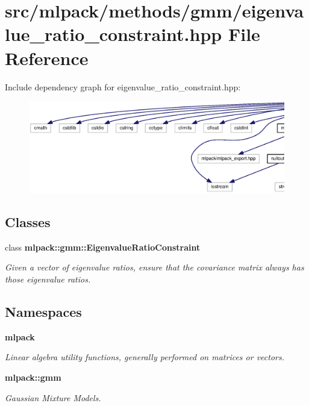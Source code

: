 \section{src/mlpack/methods/gmm/eigenvalue\+\_\+ratio\+\_\+constraint.hpp File Reference}
\label{eigenvalue__ratio__constraint_8hpp}
Include dependency graph for eigenvalue\+\_\+ratio\+\_\+constraint.\+hpp\+:
\nopagebreak
\begin{figure}[H]
\begin{center}
\leavevmode
\includegraphics[width=350pt]{eigenvalue__ratio__constraint_8hpp__incl}
\end{center}
\end{figure}
\subsection*{Classes}
\begin{DoxyCompactItemize}
\item 
class {\bf mlpack\+::gmm\+::\+Eigenvalue\+Ratio\+Constraint}
\begin{DoxyCompactList}\small\item\em Given a vector of eigenvalue ratios, ensure that the covariance matrix always has those eigenvalue ratios. \end{DoxyCompactList}\end{DoxyCompactItemize}
\subsection*{Namespaces}
\begin{DoxyCompactItemize}
\item 
 {\bf mlpack}
\begin{DoxyCompactList}\small\item\em Linear algebra utility functions, generally performed on matrices or vectors. \end{DoxyCompactList}\item 
 {\bf mlpack\+::gmm}
\begin{DoxyCompactList}\small\item\em Gaussian Mixture Models. \end{DoxyCompactList}\end{DoxyCompactItemize}



